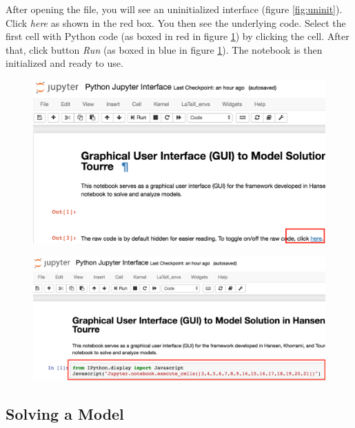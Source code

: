 \documentclass[12pt]{article}
\begin{document}
After opening the file, you will see an uninitialized interface (figure \ref{fig:uninit}). Click \textit{here} as shown in the red box. You then see the underlying code. Select the first cell with Python code (as boxed in red in figure \ref{fig:init}) by clicking the cell. After that, click button \textit{Run} (as boxed in blue in figure \ref{fig:init}). The notebook is then initialized and ready to use.

\begin{figure}[H]
\centering
\begin{minipage}{.5\textwidth}
  \centering
\includegraphics[scale=0.3]{jupyterNotebookBefore}
  \label{fig:uninit}
\end{minipage}%
\begin{minipage}{.5\textwidth}
  \centering
\includegraphics[scale=0.35]{jupyterDisplayed}
  \label{fig:init}
\end{minipage}
\end{figure}

\subsection{Solving a Model}
\end{document}
